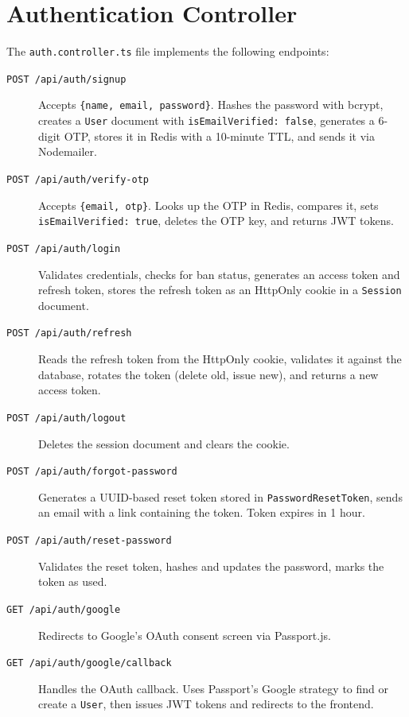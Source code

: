 \section{Authentication Controller}

The \texttt{auth.controller.ts} file implements the following endpoints:

\begin{description}
  \item[\texttt{POST /api/auth/signup}] Accepts \texttt{\{name, email, password\}}. Hashes the password with bcrypt, creates a \texttt{User} document with \texttt{isEmailVerified: false}, generates a 6-digit OTP, stores it in Redis with a 10-minute TTL, and sends it via Nodemailer.

  \item[\texttt{POST /api/auth/verify-otp}] Accepts \texttt{\{email, otp\}}. Looks up the OTP in Redis, compares it, sets \texttt{isEmailVerified: true}, deletes the OTP key, and returns JWT tokens.

  \item[\texttt{POST /api/auth/login}] Validates credentials, checks for ban status, generates an access token and refresh token, stores the refresh token as an HttpOnly cookie in a \texttt{Session} document.

  \item[\texttt{POST /api/auth/refresh}] Reads the refresh token from the HttpOnly cookie, validates it against the database, rotates the token (delete old, issue new), and returns a new access token.

  \item[\texttt{POST /api/auth/logout}] Deletes the session document and clears the cookie.

  \item[\texttt{POST /api/auth/forgot-password}] Generates a UUID-based reset token stored in \texttt{PasswordResetToken}, sends an email with a link containing the token. Token expires in 1 hour.

  \item[\texttt{POST /api/auth/reset-password}] Validates the reset token, hashes and updates the password, marks the token as used.

  \item[\texttt{GET /api/auth/google}] Redirects to Google's OAuth consent screen via Passport.js.

  \item[\texttt{GET /api/auth/google/callback}] Handles the OAuth callback. Uses Passport's Google strategy to find or create a \texttt{User}, then issues JWT tokens and redirects to the frontend.
\end{description}

